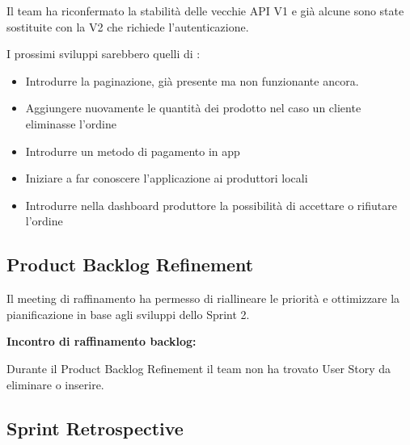 Il team ha riconfermato la stabilità delle vecchie API V1 e già alcune sono state sostituite con la V2 che richiede l'autenticazione. 

I prossimi sviluppi sarebbero quelli di :
\begin{itemize}
    \item Introdurre la paginazione, già presente ma non funzionante ancora.
    \item Aggiungere nuovamente le quantità dei prodotto nel caso un cliente eliminasse l'ordine
    \item Introdurre un metodo di pagamento in app
    \item Iniziare a far conoscere l'applicazione ai produttori locali
    \item Introdurre nella dashboard produttore la possibilità di accettare o rifiutare l'ordine
\end{itemize}

\vspace{0.5cm}

\subsection*{Product Backlog Refinement}
Il meeting di raffinamento ha permesso di riallineare le priorità e ottimizzare la pianificazione in base agli sviluppi dello Sprint 2.


\textbf{Incontro di raffinamento backlog:}

Durante il Product Backlog Refinement il team non ha trovato User Story da eliminare o inserire.

\vspace{0.5cm}

\subsection{Sprint Retrospective}

